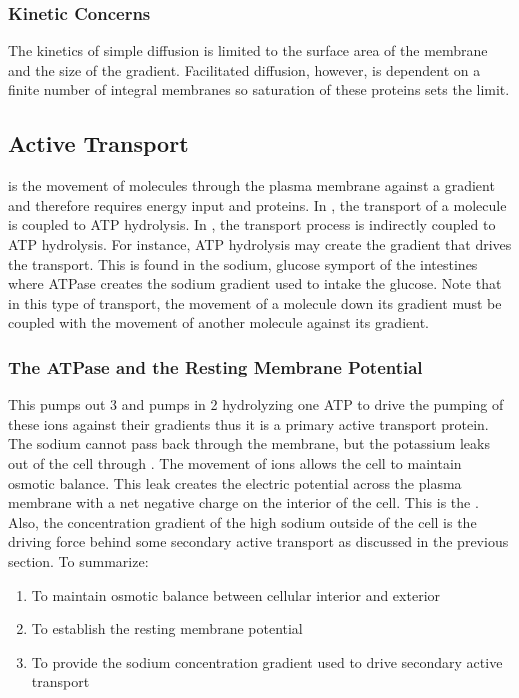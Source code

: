 \documentclass[../Bio_chemistryReview.tex]{subfiles}
\begin{document}
\subsubsection{Kinetic Concerns}
The kinetics of simple diffusion is limited to the surface area of the membrane
and the size of the gradient. Facilitated diffusion, however, is dependent on a
finite number of integral membranes so saturation of these proteins sets the
limit.

\subsection{Active Transport}
 is the movement of molecules through the plasma
membrane against a gradient and therefore requires energy input and proteins.
In , the transport of a
molecule is coupled to ATP hydrolysis. In , the transport process is indirectly coupled to ATP
hydrolysis. For instance, ATP hydrolysis may create the gradient that drives the
transport. This is found in the sodium, glucose symport of the intestines where
ATPase creates the sodium gradient used to intake the glucose. Note that in this
type of transport, the movement of a molecule down its gradient must be coupled
with the movement of another molecule against its gradient.

\subsubsection{The  ATPase and the Resting Membrane
Potential}
This pumps out 3  and pumps in 2  hydrolyzing one ATP
to drive the pumping of these ions against their gradients thus it is a primary
active transport protein. The sodium cannot pass back through the membrane, but
the potassium leaks out of the cell through .
The movement of ions allows the cell to maintain osmotic balance. This leak
creates the electric potential across the plasma membrane with a net negative
charge on the interior of the cell. This is the . Also, the concentration gradient of the high sodium outside of the
cell is the driving force behind some secondary active transport as discussed in
the previous section. To summarize:
\begin{enumerate}
  \item To maintain osmotic balance between cellular interior and exterior
  \item To establish the resting membrane potential
  \item To provide the sodium concentration gradient used to drive secondary
    active transport
\end{enumerate}
\end{document}
